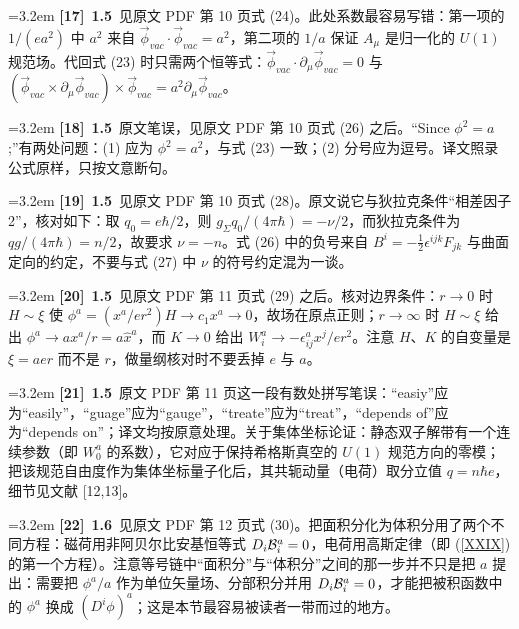 \par\medskip\noindent\hangindent=3.2em \textbf{[17]}~\textbf{1.5}~见原文 PDF 第 10 页式 (24)。此处系数最容易写错：第一项的 $1/(ea^2)$ 中 $a^2$ 来自 $\vec{\phi}_{vac}\cdot\vec{\phi}_{vac}=a^2$，第二项的 $1/a$ 保证 $A_\mu$ 是归一化的 $U(1)$ 规范场。代回式 (23) 时只需两个恒等式：$\vec{\phi}_{vac}\cdot\partial_\mu\vec{\phi}_{vac}=0$ 与 $(\vec{\phi}_{vac}\times\partial_\mu\vec{\phi}_{vac})\times\vec{\phi}_{vac}=a^2\partial_\mu\vec{\phi}_{vac}$。
\par
\par\medskip\noindent\hangindent=3.2em \textbf{[18]}~\textbf{1.5}~原文笔误，见原文 PDF 第 10 页式 (26) 之后。“Since $\phi^2=a$;”有两处问题：(1) 应为 $\phi^2=a^2$，与式 (23) 一致；(2) 分号应为逗号。译文照录公式原样，只按文意断句。
\par
\par\medskip\noindent\hangindent=3.2em \textbf{[19]}~\textbf{1.5}~见原文 PDF 第 10 页式 (28)。原文说它与狄拉克条件“相差因子 2”，核对如下：取 $q_0=e\hbar/2$，则 $g_\Sigma q_0/(4\pi\hbar)=-\nu/2$，而狄拉克条件为 $qg/(4\pi\hbar)=n/2$，故要求 $\nu=-n$。式 (26) 中的负号来自 $B^i=-\frac{1}{2}\epsilon^{ijk}F_{jk}$ 与曲面定向的约定，不要与式 (27) 中 $\nu$ 的符号约定混为一谈。
\par
\par\medskip\noindent\hangindent=3.2em \textbf{[20]}~\textbf{1.5}~见原文 PDF 第 11 页式 (29) 之后。核对边界条件：$r\to0$ 时 $H\sim\xi$ 使 $\phi^a=(x^a/er^2)H\to c_1x^a\to0$，故场在原点正则；$r\to\infty$ 时 $H\sim\xi$ 给出 $\phi^a\to ax^a/r=a\hat{x}^a$，而 $K\to0$ 给出 $W^a_i\to-\epsilon^a_{ij}x^j/er^2$。注意 $H$、$K$ 的自变量是 $\xi=aer$ 而不是 $r$，做量纲核对时不要丢掉 $e$ 与 $a$。
\par
\par\medskip\noindent\hangindent=3.2em \textbf{[21]}~\textbf{1.5}~原文 PDF 第 11 页这一段有数处拼写笔误：“easiy”应为“easily”，“guage”应为“gauge”，“treate”应为“treat”，“depends of”应为“depends on”；译文均按原意处理。关于集体坐标论证：静态双子解带有一个连续参数（即 $W^a_0$ 的系数），它对应于保持希格斯真空的 $U(1)$ 规范方向的零模；把该规范自由度作为集体坐标量子化后，其共轭动量（电荷）取分立值 $q=n\hbar e$，细节见文献 [12,13]。
\par
\par\medskip\noindent\hangindent=3.2em \textbf{[22]}~\textbf{1.6}~见原文 PDF 第 12 页式 (30)。把面积分化为体积分用了两个不同方程：磁荷用非阿贝尔比安基恒等式 $D_i{\cal B}^a_i=0$，电荷用高斯定律（即 (\ref{XXIX}) 的第一个方程）。注意等号链中“面积分”与“体积分”之间的那一步并不只是把 $a$ 提出：需要把 $\phi^a/a$ 作为单位矢量场、分部积分并用 $D_i{\cal B}^a_i=0$，才能把被积函数中的 $\phi^a$ 换成 $(D^i\phi)^a$；这是本节最容易被读者一带而过的地方。
